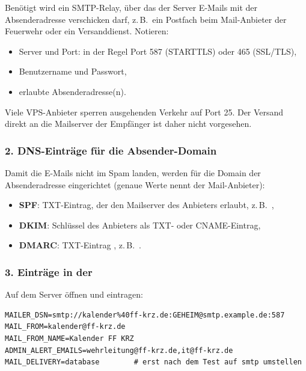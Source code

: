 Benötigt wird ein SMTP-Relay, über das der Server E-Mails mit der Absender\-adresse
 verschicken darf, z.\,B.\ ein Postfach beim
Mail-Anbieter der Feuerwehr oder ein Versanddienst. Notieren:

\begin{itemize}
  \item Server und Port: in der Regel Port 587 (STARTTLS) oder 465 (SSL/TLS),
  \item Benutzername und Passwort,
  \item erlaubte Absenderadresse(n).
\end{itemize}

Viele VPS-Anbieter sperren ausgehenden Verkehr auf Port 25. Der Versand
direkt an die Mailserver der Empfänger ist daher nicht vorgesehen.

\subsubsection*{2. DNS-Einträge für die Absender-Domain}

Damit die E-Mails nicht im Spam landen, werden für die Domain der
Absenderadresse eingerichtet (genaue Werte nennt der Mail-Anbieter):

\begin{itemize}
  \item \textbf{SPF}: TXT-Eintrag, der den Mailserver des Anbieters erlaubt,
        z.\,B.\ ,
  \item \textbf{DKIM}: Schlüssel des Anbieters als TXT- oder CNAME-Eintrag,
  \item \textbf{DMARC}: TXT-Eintrag , z.\,B.\
        .
\end{itemize}

\subsubsection*{3. Einträge in der }

Auf dem Server  öffnen und eintragen:

\begin{lstlisting}
MAILER_DSN=smtp://kalender%40ff-krz.de:GEHEIM@smtp.example.de:587
MAIL_FROM=kalender@ff-krz.de
MAIL_FROM_NAME=Kalender FF KRZ
ADMIN_ALERT_EMAILS=wehrleitung@ff-krz.de,it@ff-krz.de
MAIL_DELIVERY=database        # erst nach dem Test auf smtp umstellen
\end{lstlisting}


